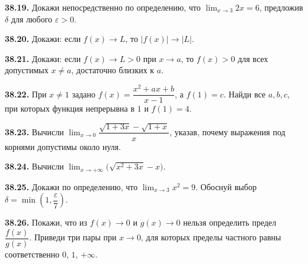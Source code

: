 \noindent\begin{minipage}[t]{\linewidth}\textbf{38.19.} Докажи непосредственно по определению, что \(\lim_{x\to3}2x=6\), предложив \(\delta\) для любого \(\varepsilon>0\).\par\end{minipage}\par
\noindent\begin{minipage}[t]{\linewidth}\textbf{38.20.} Докажи: если \(f(x)\to L\), то \(|f(x)|\to|L|\).\par\end{minipage}\par
\noindent\begin{minipage}[t]{\linewidth}\textbf{38.21.} Докажи: если \(f(x)\to L>0\) при \(x\to a\), то \(f(x)>0\) для всех допустимых \(x\ne a\), достаточно близких к \(a\).\par\end{minipage}\par
\noindent\begin{minipage}[t]{\linewidth}\textbf{38.22.}\starmark{} При \(x\ne1\) задано \(f(x)=\dfrac{x^2+ax+b}{x-1}\), а \(f(1)=c\). Найди все \(a,b,c\), при которых функция непрерывна в \(1\) и \(f(1)=4\).\par\end{minipage}\par
\noindent\begin{minipage}[t]{\linewidth}\textbf{38.23.}\starmark{} Вычисли \(\lim_{x\to0}\dfrac{\sqrt{1+3x}-\sqrt{1+x}}{x}\), указав, почему выражения под корнями допустимы около нуля.\par\end{minipage}\par
\noindent\begin{minipage}[t]{\linewidth}\textbf{38.24.}\starmark{} Вычисли \(\lim_{x\to+\infty}\bigl(\sqrt{x^2+3x}-x\bigr)\).\par\end{minipage}\par
\noindent\begin{minipage}[t]{\linewidth}\textbf{38.25.}\starmark{} Докажи по определению, что \(\lim_{x\to3}x^2=9\). Обоснуй выбор \(\delta=\min(1,\dfrac\varepsilon7)\).\par\end{minipage}\par
\noindent\begin{minipage}[t]{\linewidth}\textbf{38.26.}\starmark{} Покажи, что из \(f(x)\to0\) и \(g(x)\to0\) нельзя определить предел \(\dfrac{f(x)}{g(x)}\). Приведи три пары при \(x\to0\), для которых пределы частного равны соответственно \(0\), \(1\), \(+\infty\).\par\end{minipage}\par
\endgroup
